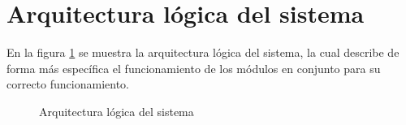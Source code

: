 \section{Arquitectura lógica del sistema}
En la figura \ref{fig:DisenoArquiLogica} se muestra la arquitectura lógica del sistema, la cual describe de forma más específica el funcionamiento de los módulos en conjunto para su correcto funcionamiento.\\



\begin{figure}[htbp!]
	\centering
	\caption{Arquitectura lógica del sistema}
	\label{fig:DisenoArquiLogica}
\end{figure}